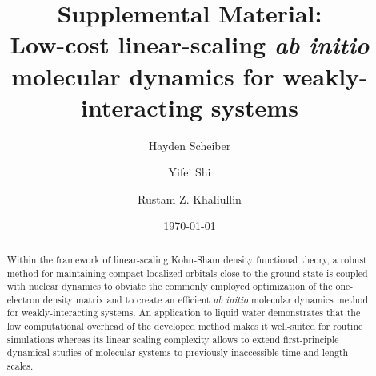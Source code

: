 \documentclass[aps,prl,reprint,amsmath,amssymb]{revtex4-1}
\newcommand*{\MAINTEXT}{}
\begin{document}
\ifdefined\MAINTEXT
\else
	\clearpage
	\setcounter{figure}{0}
	\setcounter{page}{1}
	\renewcommand{\thefigure}{S\arabic{figure}}
\fi

\title{
\ifdefined\MAINTEXT
\else
Supplemental Material: \\
\fi
Low-cost linear-scaling \emph{ab initio} molecular dynamics for weakly-interacting systems
}

\author{Hayden Scheiber}
\author{Yifei Shi}
\author{Rustam Z. Khaliullin}

\date{\today}

\ifdefined\MAINTEXT


\begin{abstract}
Within the framework of linear-scaling Kohn-Sham density functional theory, a robust method for maintaining compact localized orbitals close to the ground state is coupled with nuclear dynamics to obviate the commonly employed optimization of the one-electron density matrix and to create an efficient \emph{ab initio} molecular dynamics method for weakly-interacting systems. 
An application to liquid water demonstrates that the low computational overhead of the developed method makes it well-suited for routine simulations whereas its linear scaling complexity allows to extend first-principle dynamical studies of molecular systems to previously inaccessible time and length scales. 
\end{abstract}
\end{document}
